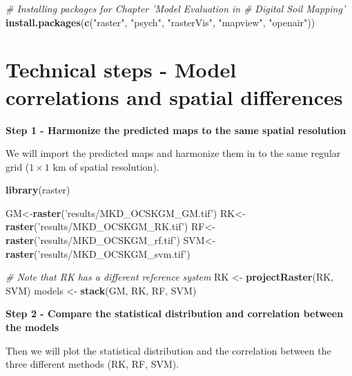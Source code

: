 \documentclass[10pt,b5paper,]{book}
\newenvironment{Shaded}{\begin{snugshade}}{\end{snugshade}}
\newcommand{\CommentTok}[1]{\textcolor[rgb]{0.56,0.35,0.01}{\textit{#1}}}
\newcommand{\KeywordTok}[1]{\textcolor[rgb]{0.13,0.29,0.53}{\textbf{#1}}}
\newcommand{\NormalTok}[1]{#1}
\newcommand{\StringTok}[1]{\textcolor[rgb]{0.31,0.60,0.02}{#1}}
\theoremstyle{definition}
\theoremstyle{definition}
\theoremstyle{definition}
\theoremstyle{remark}
\begin{document}
\begin{Shaded}
\begin{Highlighting}[]
\CommentTok{# Installing packages for Chapter 'Model Evaluation in}
\CommentTok{# Digital Soil Mapping'}
\KeywordTok{install.packages}\NormalTok{(}\KeywordTok{c}\NormalTok{(}\StringTok{"raster"}\NormalTok{, }\StringTok{"psych"}\NormalTok{, }\StringTok{"rasterVis"}\NormalTok{,}
                   \StringTok{"mapview"}\NormalTok{, }\StringTok{"openair"}\NormalTok{))}
\end{Highlighting}
\end{Shaded}

\hypertarget{technical-steps---model-correlations-and-spatial-differences}{%
\section{Technical steps - Model correlations and spatial
differences}\label{technical-steps---model-correlations-and-spatial-differences}}

\textbf{Step 1 - Harmonize the predicted maps to the same spatial
resolution}

We will import the predicted maps and harmonize them in to the same
regular grid (\(1 \times 1\) km of spatial resolution).

\begin{Shaded}
\begin{Highlighting}[]
\KeywordTok{library}\NormalTok{(raster)}

\NormalTok{GM<-}\KeywordTok{raster}\NormalTok{(}\StringTok{'results/MKD_OCSKGM_GM.tif'}\NormalTok{)}
\NormalTok{RK<-}\KeywordTok{raster}\NormalTok{(}\StringTok{'results/MKD_OCSKGM_RK.tif'}\NormalTok{)}
\NormalTok{RF<-}\KeywordTok{raster}\NormalTok{(}\StringTok{'results/MKD_OCSKGM_rf.tif'}\NormalTok{)}
\NormalTok{SVM<-}\KeywordTok{raster}\NormalTok{(}\StringTok{'results/MKD_OCSKGM_svm.tif'}\NormalTok{)}

\CommentTok{# Note that RK has a different reference system }
\NormalTok{RK <-}\StringTok{ }\KeywordTok{projectRaster}\NormalTok{(RK, SVM)}
\NormalTok{models <-}\StringTok{ }\KeywordTok{stack}\NormalTok{(GM, RK, RF, SVM)}
\end{Highlighting}
\end{Shaded}

\textbf{Step 2 - Compare the statistical distribution and correlation
between the models}

Then we will plot the statistical distribution and the correlation
between the three different methods (RK, RF, SVM).
\end{document}
